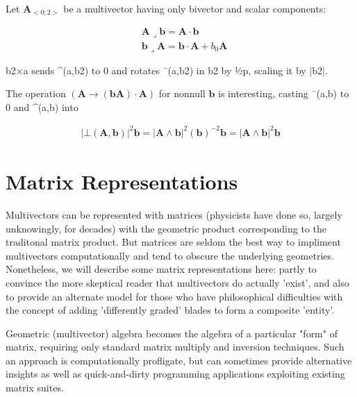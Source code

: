 \documentclass[a4paper]{book}
\numberwithin{equation}{chapter}
\begin{document}
\vspace{\baselineskip}

Let $\mathbf{A}_{<0;2>}$ be a multivector having only bivector and scalar components:

\begin{align*}
    &\mathbf{A\lrcorner b}= \mathbf{A\cdot b} \\
    &\mathbf{b \lrcorner A = b \cdot A} + b_0\mathbf{A}
\end{align*}

b2×a sends ^(a,b2) to 0 and rotates ¯(a,b2) in b2 by ½p, scaling it by |b2|.

\vspace{\baselineskip}

The operation $(\mathbf{A} \rightarrow \mathbf{(bA)\cdot A})$ 
for nonnull $\mathbf{b}$ is interesting, casting ¯(a,b) to 0 and ^(a,b) into

\begin{align*}
    | \bot(\mathbf{A,b})|^2\mathbf{b} = |\mathbf{A\wedge b}|^2(\mathbf{b})^{-2}\mathbf{b} = |\mathbf{A\wedge b}|^2\mathbf{b}
\end{align*}

   

    \section{Matrix Representations}

Multivectors can be represented with matrices (physicists have done so, largely unknowingly, for 
decades) with the geometric product corresponding to the traditonal matrix product. But matrices 
are seldom the best way to impliment multivectors computationally and tend to obscure the 
underlying geometries. Nonetheless, we will describe some matrix representations here: partly to 
convince the more skeptical reader that multivectors do actually 'exist', and also to provide an 
alternate model for those who have philosophical difficulties with the concept of adding 
'differently graded' blades to form a composite 'entity'. 

\vspace{\baselineskip}

Geometric (multivector) algebra becomes the
algebra of a particular "form" of matrix, requiring only standard matrix multiply and inversion 
techniques. Such an approach is computationally profligate, but can sometimes provide alternative 
insights as well as quick-and-dirty programming applications exploiting existing matrix suites. 
\end{document}
